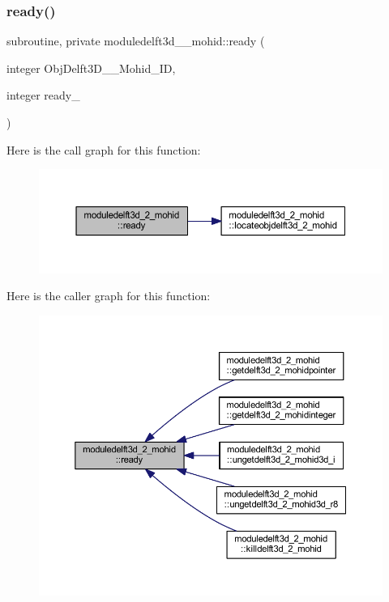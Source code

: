 \subsubsection{\texorpdfstring{ready()}{ready()}}
{\footnotesize\ttfamily subroutine, private moduledelft3d\+\_\+\_\+mohid\+::ready (\begin{DoxyParamCaption}\item[{integer}]{Obj\+Delft3\+D\+\_\+\_\+\+Mohid\+\_\+\+ID,  }\item[{integer}]{ready\+\_\+ }\end{DoxyParamCaption})\hspace{0.3cm}{\ttfamily [private]}}

Here is the call graph for this function\+:\nopagebreak
\begin{figure}[H]
\begin{center}
\leavevmode
\includegraphics[width=350pt]{namespacemoduledelft3d__2__mohid_a6327ce6561d3a18563b847433529a19d_cgraph}
\end{center}
\end{figure}
Here is the caller graph for this function\+:\nopagebreak
\begin{figure}[H]
\begin{center}
\leavevmode
\includegraphics[width=350pt]{namespacemoduledelft3d__2__mohid_a6327ce6561d3a18563b847433529a19d_icgraph}
\end{center}
\end{figure}
\mbox{\label{namespacemoduledelft3d__2__mohid_aa4cca39e63d47844aa594f71d019af8c}} 
